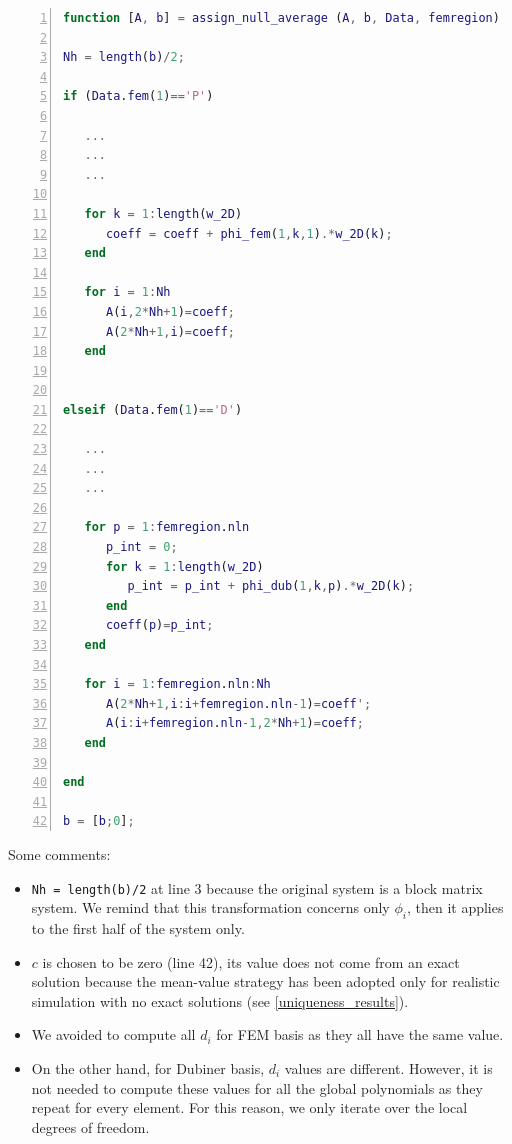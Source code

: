 \documentclass[a4paper,11pt]{article}
\begin{document}
\begin{lstlisting}[language=Matlab,basicstyle=\small, numbers=left, numberstyle=\tiny,  name = assign_null_average.m, frame=single]
function [A, b] = assign_null_average (A, b, Data, femregion)

Nh = length(b)/2;

if (Data.fem(1)=='P')

   ...
   ...
   ...

   for k = 1:length(w_2D)
      coeff = coeff + phi_fem(1,k,1).*w_2D(k);
   end

   for i = 1:Nh
      A(i,2*Nh+1)=coeff;
      A(2*Nh+1,i)=coeff;
   end


elseif (Data.fem(1)=='D')

   ...
   ...
   ...

   for p = 1:femregion.nln
      p_int = 0;
      for k = 1:length(w_2D)
         p_int = p_int + phi_dub(1,k,p).*w_2D(k);
      end
      coeff(p)=p_int;
   end

   for i = 1:femregion.nln:Nh
      A(2*Nh+1,i:i+femregion.nln-1)=coeff';
      A(i:i+femregion.nln-1,2*Nh+1)=coeff;
   end

end

b = [b;0];

\end{lstlisting}
\vspace{8mm}
\noindent Some comments:
\begin{itemize}
	\item \texttt{Nh = length(b)/2} at line 3 because the original system is a block matrix system. We remind that this transformation concerns only $\phi_i$, then it applies to the first half of the system only.
	\item $c$ is chosen to be zero (line 42), its value does not come from an exact solution because the mean-value strategy has been adopted only for realistic simulation with no exact solutions (see \ref{uniqueness_results}). 
	\item We avoided to compute all $d_i$ for FEM basis as they all have the same value.
	\item On the other hand, for Dubiner basis, $d_i$ values are different. However, it is not needed to compute these values for all the global polynomials as they repeat for every element. For this reason, we only iterate over the local degrees of freedom.
\end{itemize}
\vspace{6mm}
\end{document}
